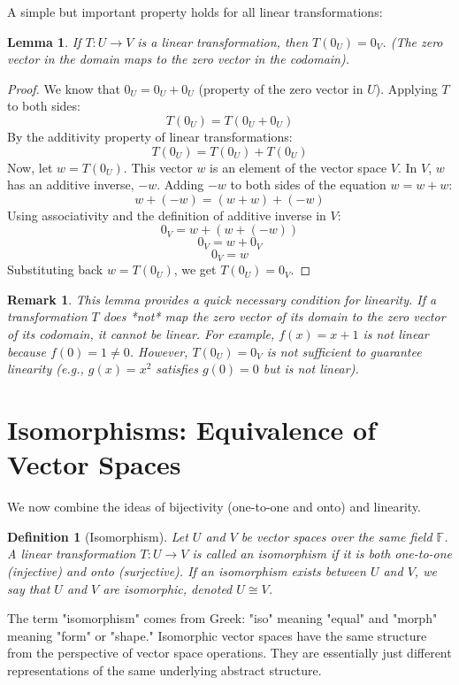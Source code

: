 \documentclass[11pt, letterpaper]{article}
\theoremstyle{mytheoremstyle}
\newtheorem{lemma}[theorem]{Lemma}
\theoremstyle{mydefinitionstyle}
\newtheorem{definition}[theorem]{Definition}
\theoremstyle{myremarkstyle}
\newtheorem{remark}[theorem]{Remark}
\newcommand{\F}{\mathbb{F}}
\begin{document}
A simple but important property holds for all linear transformations:

\begin{lemma}
If $T: U \to V$ is a linear transformation, then $T(0_U) = 0_V$. (The zero vector in the domain maps to the zero vector in the codomain).
\end{lemma}
\begin{proof}
We know that $0_U = 0_U + 0_U$ (property of the zero vector in $U$). Applying $T$ to both sides:
\[ T(0_U) = T(0_U + 0_U) \]
By the additivity property of linear transformations:
\[ T(0_U) = T(0_U) + T(0_U) \]
Now, let $w = T(0_U)$. This vector $w$ is an element of the vector space $V$. In $V$, $w$ has an additive inverse, $-w$. Adding $-w$ to both sides of the equation $w = w + w$:
\[ w + (-w) = (w + w) + (-w) \]
Using associativity and the definition of additive inverse in $V$:
\[ 0_V = w + (w + (-w)) \]
\[ 0_V = w + 0_V \]
\[ 0_V = w \]
Substituting back $w = T(0_U)$, we get $T(0_U) = 0_V$.
\end{proof}
\begin{remark}
This lemma provides a quick necessary condition for linearity. If a transformation $T$ does *not* map the zero vector of its domain to the zero vector of its codomain, it cannot be linear. For example, $f(x) = x+1$ is not linear because $f(0) = 1 \neq 0$. However, $T(0_U) = 0_V$ is not sufficient to guarantee linearity (e.g., $g(x)=x^2$ satisfies $g(0)=0$ but is not linear).
\end{remark}

\section{Isomorphisms: Equivalence of Vector Spaces}

We now combine the ideas of bijectivity (one-to-one and onto) and linearity.

\begin{definition}[Isomorphism]
Let $U$ and $V$ be vector spaces over the same field $\F$. A linear transformation $T: U \to V$ is called an \emph{isomorphism} if it is both one-to-one (injective) and onto (surjective).
If an isomorphism exists between $U$ and $V$, we say that $U$ and $V$ are \emph{isomorphic}, denoted $U \cong V$.
\end{definition}

The term "isomorphism" comes from Greek: "iso" meaning "equal" and "morph" meaning "form" or "shape." Isomorphic vector spaces have the same structure from the perspective of vector space operations. They are essentially just different representations of the same underlying abstract structure.
\end{document}
